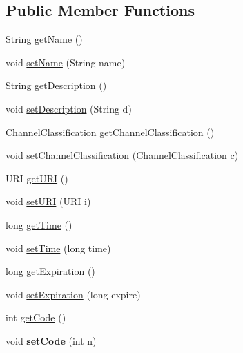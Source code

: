 \subsection*{Public Member Functions}
\begin{DoxyCompactItemize}
\item 
String \hyperlink{classgov_1_1fnal_1_1ppd_1_1dd_1_1emergency_1_1EmergCommunicationImpl_a777c8533c18e551ffc31e3004c2b129d}{get\-Name} ()
\item 
void \hyperlink{classgov_1_1fnal_1_1ppd_1_1dd_1_1emergency_1_1EmergCommunicationImpl_ac3b27088fbf8a1641390f94a9bceae05}{set\-Name} (String name)
\item 
String \hyperlink{classgov_1_1fnal_1_1ppd_1_1dd_1_1emergency_1_1EmergCommunicationImpl_abb47282cc4f97a7f5b8a2f95ef98801b}{get\-Description} ()
\item 
void \hyperlink{classgov_1_1fnal_1_1ppd_1_1dd_1_1emergency_1_1EmergCommunicationImpl_a68bef53238492c65abac631c7d830201}{set\-Description} (String d)
\item 
\hyperlink{classgov_1_1fnal_1_1ppd_1_1dd_1_1changer_1_1ChannelClassification}{Channel\-Classification} \hyperlink{classgov_1_1fnal_1_1ppd_1_1dd_1_1emergency_1_1EmergCommunicationImpl_a1d603af23e42a20faa68eaf2de08cbcd}{get\-Channel\-Classification} ()
\item 
void \hyperlink{classgov_1_1fnal_1_1ppd_1_1dd_1_1emergency_1_1EmergCommunicationImpl_a4af13843cde9c0635c9c9159382f56af}{set\-Channel\-Classification} (\hyperlink{classgov_1_1fnal_1_1ppd_1_1dd_1_1changer_1_1ChannelClassification}{Channel\-Classification} c)
\item 
U\-R\-I \hyperlink{classgov_1_1fnal_1_1ppd_1_1dd_1_1emergency_1_1EmergCommunicationImpl_ab68ea958a435d5ae82a8ab8ed1de147f}{get\-U\-R\-I} ()
\item 
void \hyperlink{classgov_1_1fnal_1_1ppd_1_1dd_1_1emergency_1_1EmergCommunicationImpl_a1c1908434df69dea4854e5b5f44fff68}{set\-U\-R\-I} (U\-R\-I i)
\item 
long \hyperlink{classgov_1_1fnal_1_1ppd_1_1dd_1_1emergency_1_1EmergCommunicationImpl_a479c9d6bc4063377c83d165b6f5132b6}{get\-Time} ()
\item 
void \hyperlink{classgov_1_1fnal_1_1ppd_1_1dd_1_1emergency_1_1EmergCommunicationImpl_adeaeaa2f1d16e60ac141358bdb55695e}{set\-Time} (long time)
\item 
long \hyperlink{classgov_1_1fnal_1_1ppd_1_1dd_1_1emergency_1_1EmergCommunicationImpl_ab232b4e07d053e1f92801c62f80d0fed}{get\-Expiration} ()
\item 
void \hyperlink{classgov_1_1fnal_1_1ppd_1_1dd_1_1emergency_1_1EmergCommunicationImpl_aa355b690547d8073523804141988b532}{set\-Expiration} (long expire)
\item 
int \hyperlink{classgov_1_1fnal_1_1ppd_1_1dd_1_1emergency_1_1EmergCommunicationImpl_afcf5791a5c549b60452054993bd9b9b0}{get\-Code} ()
\item 
\hypertarget{classgov_1_1fnal_1_1ppd_1_1dd_1_1emergency_1_1EmergCommunicationImpl_a396b9a2b1c18c674754bdeb7aad40baf}{void {\bfseries set\-Code} (int n)}\label{classgov_1_1fnal_1_1ppd_1_1dd_1_1emergency_1_1EmergCommunicationImpl_a396b9a2b1c18c674754bdeb7aad40baf}


\end{DoxyCompactItemize}
